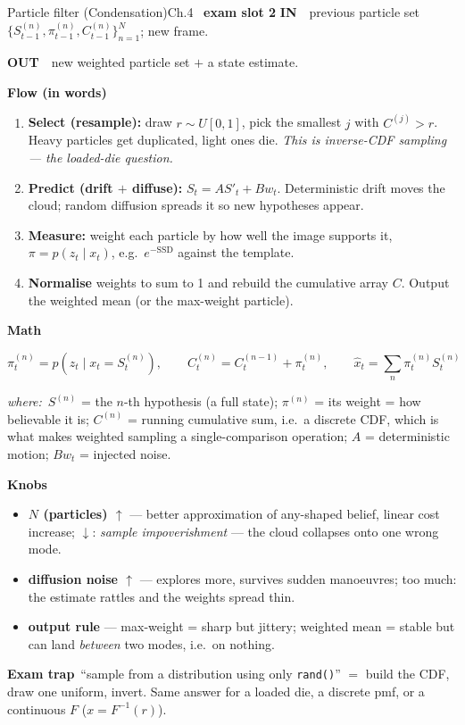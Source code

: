 \documentclass[9pt,a4paper]{extarticle}
\newcommand{\IN}{\textbf{\color{cIn}IN}\ }
\newcommand{\OUT}{\par\textbf{\color{cOut}OUT}\ }
\newcommand{\FLOW}{\par\smallskip\textbf{Flow (in words)}\par\nopagebreak}
\newcommand{\MATH}{\par\smallskip\textbf{Math}\par\nopagebreak}
\newcommand{\KNOBS}{\par\smallskip\textbf{Knobs}\par\nopagebreak}
\newcommand{\TRAP}{\par\smallskip\textbf{\color{cTrap}Exam trap}\ }
\newcommand{\WHERE}{\par\textit{where:}\ }
\newcommand{\up}{$\uparrow$}
\newcommand{\dn}{$\downarrow$}
\newcommand{\kn}[2]{\item \textbf{#1} --- #2}
\begin{document}
\begin{card}{Particle filter (Condensation)}{Ch.4 \textbullet\ \textbf{exam slot 2}}
\IN\ previous particle set $\{S_{t-1}^{(n)},\pi_{t-1}^{(n)},C_{t-1}^{(n)}\}_{n=1}^N$; new frame.
\OUT\ new weighted particle set $+$ a state estimate.

\FLOW
\begin{enumerate}
  \item \textbf{Select (resample):} draw $r\sim U[0,1]$, pick the smallest $j$ with $C^{(j)}>r$. Heavy particles get duplicated, light ones die. \emph{This is inverse-CDF sampling --- the loaded-die question.}
  \item \textbf{Predict (drift $+$ diffuse):} $S_t=A S'_t+Bw_t$. Deterministic drift moves the cloud; random diffusion spreads it so new hypotheses appear.
  \item \textbf{Measure:} weight each particle by how well the image supports it, $\pi=p(z_t\mid x_t)$, e.g.\ $e^{-\mathrm{SSD}}$ against the template.
  \item \textbf{Normalise} weights to sum to 1 and rebuild the cumulative array $C$. Output the weighted mean (or the max-weight particle).
\end{enumerate}

\MATH
\[ \pi_t^{(n)}=p(z_t\mid x_t=S_t^{(n)}),\qquad C_t^{(n)}=C_t^{(n-1)}+\pi_t^{(n)},\qquad \hat x_t=\sum_n\pi_t^{(n)}S_t^{(n)} \]
\WHERE $S^{(n)}$ = the $n$-th hypothesis (a full state); $\pi^{(n)}$ = its weight = how believable it is; $C^{(n)}$ = running cumulative sum, i.e.\ a discrete CDF, which is what makes weighted sampling a single-comparison operation; $A$ = deterministic motion; $B w_t$ = injected noise.

\KNOBS
\begin{itemize}
  \kn{$N$ (particles) \up}{better approximation of any-shaped belief, linear cost increase; \dn: \emph{sample impoverishment} --- the cloud collapses onto one wrong mode.}
  \kn{diffusion noise \up}{explores more, survives sudden manoeuvres; too much: the estimate rattles and the weights spread thin.}
  \kn{output rule}{max-weight = sharp but jittery; weighted mean = stable but can land \emph{between} two modes, i.e.\ on nothing.}
\end{itemize}
\TRAP ``sample from a distribution using only \texttt{rand()}'' $=$ build the CDF, draw one uniform, invert. Same answer for a loaded die, a discrete pmf, or a continuous $F$ ($x=F^{-1}(r)$).
\end{card}

\end{document}
